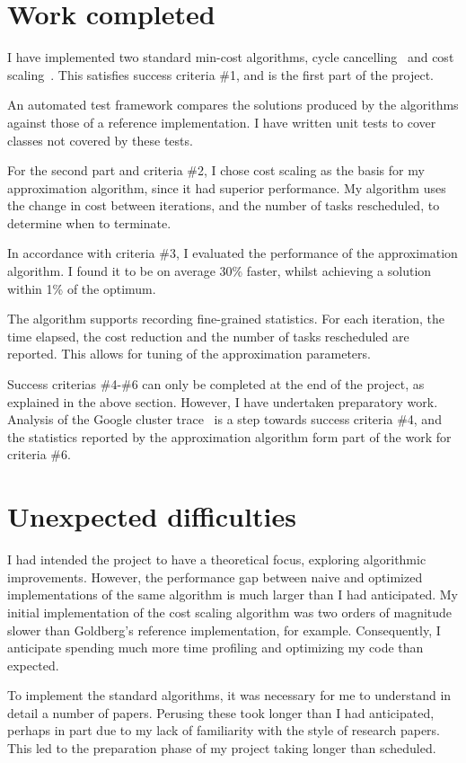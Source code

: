 \section{Work completed}

I have implemented two standard min-cost algorithms, cycle cancelling~\cite{Klein:1967} and cost scaling~\cite{Goldberg:1987}. This satisfies success criteria \#1, and is the first part of the project.

An automated test framework compares the solutions produced by the algorithms against those of a reference implementation. I have written unit tests to cover classes not covered by these tests.

For the second part and criteria \#2, I chose cost scaling as the basis for my approximation algorithm, since it had superior performance. My algorithm uses the change in cost between iterations, and the number of tasks rescheduled, to determine when to terminate.

In accordance with criteria \#3, I evaluated the performance of the approximation algorithm. I found it to be on average 30\% faster, whilst achieving a solution within 1\% of the optimum. 

The algorithm supports recording fine-grained statistics. For each iteration, the time elapsed, the cost reduction and the number of tasks rescheduled are reported. This allows for tuning of the approximation parameters.

Success criterias \#4-\#6 can only be completed at the end of the project, as explained in the above section. However, I have undertaken preparatory work. Analysis of the Google cluster trace~\cite{clusterdata:Wilkes2011} is a step towards success criteria \#4, and the statistics reported by the approximation algorithm form part of the work for criteria \#6.

\section{Unexpected difficulties}

I had intended the project to have a theoretical focus, exploring algorithmic improvements. However, the performance gap between naive and optimized implementations of the same algorithm is much larger than I had anticipated. My initial implementation of the cost scaling algorithm was two orders of magnitude slower than Goldberg's reference implementation, for example. Consequently, I anticipate spending much more time profiling and optimizing my code than expected.

To implement the standard algorithms, it was necessary for me to understand in detail a number of papers. Perusing these took longer than I had anticipated, perhaps in part due to my lack of familiarity with the style of research papers. This led to the preparation phase of my project taking longer than scheduled.
